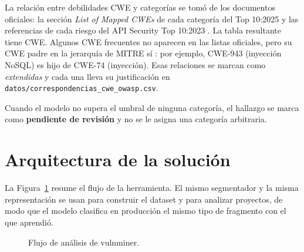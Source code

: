 \documentclass[12pt,a4paper]{article}
\newcommand{\ruta}[1]{\nolinkurl{#1}}
\begin{document}
La relación entre debilidades CWE y categorías se tomó de los documentos oficiales: la sección \emph{List of Mapped CWEs} de cada categoría del Top 10:2025 y las referencias de cada riesgo del API Security Top 10:2023 \cite{owasp2025,owaspapi}. La tabla resultante tiene \nCWEtabla{} CWE. Algunos CWE frecuentes no aparecen en las listas oficiales, pero su CWE padre en la jerarquía de MITRE sí \cite{cwe}: por ejemplo, CWE-943 (inyección NoSQL) es hijo de CWE-74 (inyección). Esas relaciones se marcan como \emph{extendidas} y cada una lleva su justificación en \ruta{datos/correspondencias_cwe_owasp.csv}.

Cuando el modelo no supera el umbral de ninguna categoría, el hallazgo se marca como \textbf{pendiente de revisión} y no se le asigna una categoría arbitraria.

\section{Arquitectura de la solución}
La Figura~\ref{fig:arquitectura} resume el flujo de la herramienta. El mismo segmentador y la misma representación se usan para construir el dataset y para analizar proyectos, de modo que el modelo clasifica en producción el mismo tipo de fragmento con el que aprendió.

\begin{figure}[H]
\centering
{}
\caption{Flujo de análisis de vulnminer.}
\label{fig:arquitectura}
\end{figure}
\end{document}
